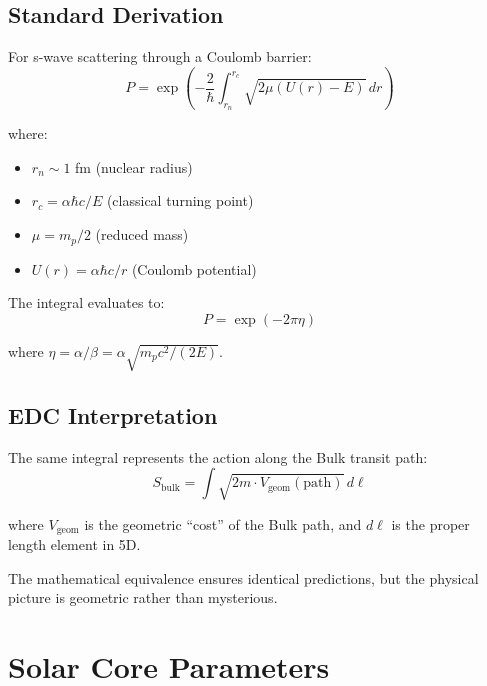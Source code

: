 \documentclass[12pt,a4paper]{article}
\begin{document}
\subsection{Standard Derivation}

For s-wave scattering through a Coulomb barrier:
\begin{equation}
P = \exp\left(-\frac{2}{\hbar}\int_{r_n}^{r_c} \sqrt{2\mu(U(r)-E)} \, dr\right)
\end{equation}

where:
\begin{itemize}
    \item $r_n \sim 1$ fm (nuclear radius)
    \item $r_c = \alpha\hbar c/E$ (classical turning point)
    \item $\mu = m_p/2$ (reduced mass)
    \item $U(r) = \alpha\hbar c/r$ (Coulomb potential)
\end{itemize}

The integral evaluates to:
\begin{equation}
P = \exp(-2\pi\eta)
\end{equation}

where $\eta = \alpha/\beta = \alpha\sqrt{m_pc^2/(2E)}$.

\subsection{EDC Interpretation}

The same integral represents the action along the Bulk transit path:
\begin{equation}
S_{\text{bulk}} = \int \sqrt{2m \cdot V_{\text{geom}}(\text{path})} \, d\ell
\end{equation}

where $V_{\text{geom}}$ is the geometric ``cost'' of the Bulk path, and $d\ell$ is the proper length element in 5D.

The mathematical equivalence ensures identical predictions, but the physical picture is geometric rather than mysterious.

\section{Solar Core Parameters}
\end{document}
